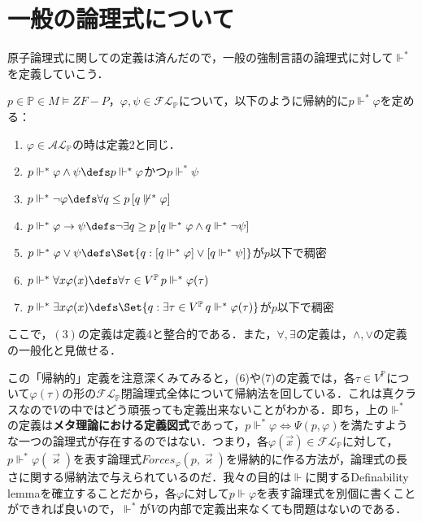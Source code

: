 \documentclass[a4j]{bxjsarticle}
\theoremstyle{definition}
\begin{document}
\section{一般の論理式について}
原子論理式に関しての定義は済んだので，一般の強制言語の論理式に対して$\mathrel{\Vdash^*}$ を定義していこう．

\begin{definition}\label{def:forces}
 $p \in \mathbb{P} \in M \models ZF - P$，$\varphi, \psi \in \mathcal{FL}_\mathbb{P}$について，以下のように帰納的に$p \mathrel{\Vdash^*} \varphi$を定める：
 \begin{enumerate}
  \item $\varphi \in \mathcal{AL}_\mathbb{P}$の時は定義2と同じ．
  \item $p \mathrel{\Vdash^*} \varphi \wedge \psi \defs p \mathrel{\Vdash^*} \varphi$かつ$p \mathrel{\Vdash^*} \psi$
  \item $p \mathrel{\Vdash^*} \neg \varphi \defs \forall q \leq p \,[ q \not \mathrel{\Vdash^*} \varphi]$\label{forces:neg-def}
  \item $p \mathrel{\Vdash^*} \varphi \rightarrow \psi \defs \neg \exists q \geq p \,[q \mathrel{\Vdash^*} \varphi \wedge q \mathrel{\Vdash^*} \neg \psi]$
  \item $p \mathrel{\Vdash^*} \varphi \vee \psi \defs \Set{ q : [q \mathrel{\Vdash^*} \varphi] \vee [q \mathrel{\Vdash^*} \psi]}$が$p$以下で稠密
  \item $p \mathrel{\Vdash^*} \forall x \varphi(x) \defs \forall \tau \in V^\mathbb{P} \, p \mathrel{\Vdash^*} \varphi(\tau)$
	\label{forces:universal}
  \item $p \mathrel{\Vdash^*} \exists x \varphi(x) \defs \Set{q : \exists \tau \in V^\mathbb{P} \, q \mathrel{\Vdash^*} \varphi(\tau)}$が$p$以下で稠密
	\label{forces:existential}
 \end{enumerate}
\end{definition}
ここで，$(3)$の定義は定義4と整合的である．また，$\forall, \exists$の定義は，$\wedge, \vee$の定義の一般化と見做せる．

この「帰納的」定義を注意深くみてみると，(6)や(7)の定義では，各$\tau \in V^\mathbb{P}$について$\varphi(\tau)$の形の$\mathcal{FL}_\mathbb{P}$閉論理式全体について帰納法を回している．これは真クラスなので$V$の中ではどう頑張っても定義出来ないことがわかる．即ち，上の$\mathrel{\Vdash^*}$の定義は\textbf{メタ理論における定義図式}であって，$p \mathrel{\Vdash^*} \varphi \Leftrightarrow \Psi(p, \varphi)$を満たすような一つの論理式が存在するのではない．つまり，各$\varphi(\vec{x}) \in \mathcal{FL}_\mathbb{P}$に対して，$p \mathrel{\Vdash^*} \varphi(\vec{\varkappa})$を表す論理式$Forces_\varphi(p, \vec{\varkappa})$を帰納的に作る方法が，論理式の長さに関する帰納法で与えられているのだ．我々の目的は$\Vdash$に関するDefinability lemmaを確立することだから，各$\varphi$に対して$p \Vdash \varphi$を表す論理式を別個に書くことができれば良いので，$\mathrel{\Vdash^*}$が$V$の内部で定義出来なくても問題はないのである．
\end{document}
